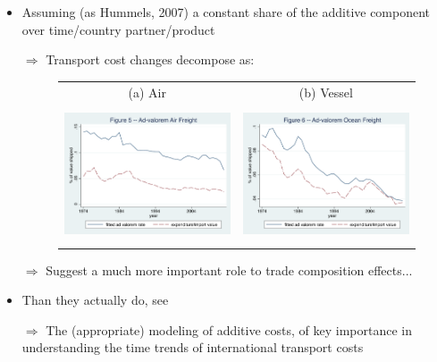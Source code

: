 \documentclass[10 pt,Helvetica, french]{beamer}
\begin{document}
\begin{frame}
\begin{itemize}
\item Assuming (as Hummels, 2007) a constant share of the additive component over time/country partner/product \vspace{0.1cm}
\item[$\Rightarrow$] Transport cost changes decompose as:
\begin{figure}[htbp]
\begin{center}
\begin{tabular}{cc}
{\scriptsize (a) Air } & {\scriptsize (b) Vessel}\\
\includegraphics[width=5cm, height=4cm]{figure5_comme_hummels_air.pdf}
& \includegraphics[width=5cm,height=4cm]{figure6_comme_hummels_ocean.pdf} \\
\end{tabular}
\end{center}
\end{figure}
\item[$\Rightarrow$] Suggest a much more important role to trade composition effects...  \vspace{0.1cm}
\item Than they actually do, see \hyperlink{slide_compeffects_figure}{} \vspace{0.1cm}

\item[$\Rightarrow$] The (appropriate) modeling of additive costs, of key importance in understanding the time trends of international transport costs
\end{itemize}
\end{frame}
\end{document}
